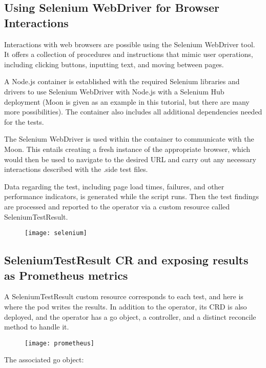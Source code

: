 \subsection{Using Selenium WebDriver for Browser Interactions}

Interactions with web browsers are possible using the Selenium WebDriver tool. It offers a collection of procedures and instructions that mimic user operations, including clicking buttons, inputting text, and moving between pages.

A Node.js container is established with the required Selenium libraries and drivers to use Selenium WebDriver with Node.js with a Selenium Hub deployment (Moon is given as an example in this tutorial, but there are many more possibilities). The container also includes all additional dependencies needed for the tests.

The Selenium WebDriver is used within the container to communicate with the Moon. This entails creating a fresh instance of the appropriate browser, which would then be used to navigate to the desired URL and carry out any necessary interactions described with the .side test files.

Data regarding the test, including page load times, failures, and other performance indicators, is generated while the script runs. Then the test findings are processed and reported to the operator via a custom resource called SeleniumTestResult.

\begin{figure}[H]
	\centering
	\texttt{[image: selenium]}
	\label{fig:selenium}
\end{figure}

\subsection{SeleniumTestResult CR and exposing results as Prometheus metrics}

A SeleniumTestResult custom resource corresponds to each test, and here is where the pod writes the results. In addition to the operator, its CRD is also deployed, and the operator has a go object, a controller, and a distinct reconcile method to handle it.

\begin{figure}[H]
	\centering
	\texttt{[image: prometheus]}
	\label{fig:prometheus}
\end{figure}

The associated go object:
    
